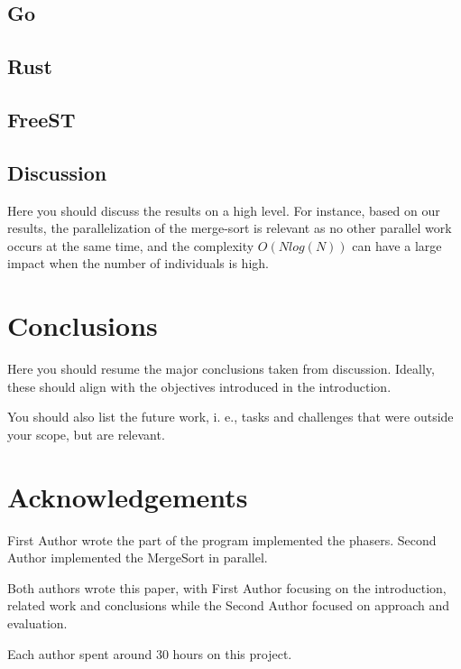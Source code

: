 \documentclass[runningheads]{llncs}
\begin{document}
\subsection{Go}
\lipsum[1]
\subsection{Rust}
\lipsum[1]
\subsection{FreeST}
\lipsum[1]
\subsection{Discussion}
Here you should discuss the results on a high level. For instance, based on our results, the parallelization of the merge-sort is relevant as no other parallel work occurs at the same time, and the complexity $O(N log(N))$ can have a large impact when the number of individuals is high.
\section{Conclusions}
Here you should resume the major conclusions taken from discussion. Ideally, these should align with the objectives introduced in the introduction.


You should also list the future work, i. e., tasks and challenges that were outside your scope, but are relevant.
\section*{Acknowledgements}
First Author wrote the part of the program implemented the phasers. Second Author implemented the MergeSort in parallel. 

Both authors wrote this paper, with First Author focusing on the introduction, related work and conclusions while the Second Author focused on approach and evaluation.

Each author spent around 30 hours on this project.


\end{document}
